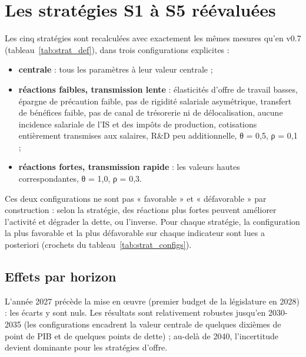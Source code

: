 \chapter{Les stratégies S1 à S5 réévaluées}\label{ch:strategies}

Les cinq stratégies sont recalculées avec exactement les mêmes mesures qu'en v0.7 (tableau~\ref{tab:strat_def}), dans
trois configurations explicites :
\begin{itemize}
\item \textbf{centrale} : tous les paramètres à leur valeur centrale ;
\item \textbf{réactions faibles, transmission lente} : élasticités d'offre de travail basses, épargne de précaution
faible, pas de rigidité salariale asymétrique, transfert de bénéfices faible, pas de canal de trésorerie ni de
délocalisation, aucune incidence salariale de l'IS et des impôts de production, cotisations entièrement transmises
aux salaires, R\&D peu additionnelle, θ = 0,5, ρ = 0,1 ;
\item \textbf{réactions fortes, transmission rapide} : les valeurs hautes correspondantes, θ = 1,0, ρ = 0,3.
\end{itemize}
Ces deux configurations ne sont pas « favorable » et « défavorable » par construction : selon la stratégie, des
réactions plus fortes peuvent améliorer l'activité et dégrader la dette, ou l'inverse. Pour chaque stratégie, la
configuration la plus favorable et la plus défavorable sur chaque indicateur sont lues a posteriori (crochets du
tableau~\ref{tab:strat_configs}).

\begin{table}[htbp]\centering\scriptsize
\caption{Mesures des stratégies (écart à la situation actuelle ; identiques à la v0.7).}\label{tab:strat_def}
\end{table}

\section{Effets par horizon}

{\small\setlength{\tabcolsep}{4pt}}

L'année 2027 précède la mise en œuvre (premier budget de la législature en 2028) : les écarts y sont nuls. Les
résultats sont relativement robustes jusqu'en 2030-2035 (les configurations encadrent la valeur centrale de quelques
dixièmes de point de PIB et de quelques points de dette) ; au-delà de 2040, l'incertitude devient dominante pour les
stratégies d'offre.

